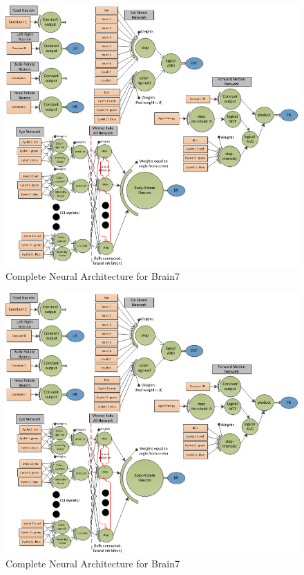 \documentclass[a4paper,11pt]{article}
\begin{document}
\begin{figure}
\begin{center}
  \includegraphics[scale=1.0]{img/brain7complete.png}
  \caption{Complete Neural Architecture for Brain7 }
  \label{fig:brain7complete}
\end{center}
\end{figure}

\begin{figure}
\begin{center}
  \includegraphics[scale=1.0]{img/brain7complete.png}
  \caption{Complete Neural Architecture for Brain7 }
  \label{fig:brain7complete}
\end{center}
\end{figure}
\end{document}
